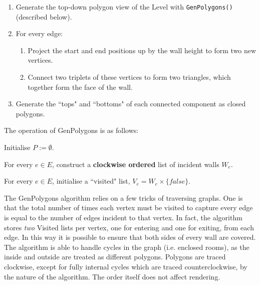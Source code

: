 \begin{enumerate}
\item Generate the top-down polygon view of the Level with \verb|GenPolygons()| (described below).
\item For every edge:
\begin{enumerate}
\item Project the start and end positions up by the wall height to form two new vertices.
\item Connect two triplets of these vertices to form two triangles, which together form the face of the wall.
\end{enumerate}
\item Generate the ``tops" and ``bottoms" of each connected component as closed polygons.
\end{enumerate}

The operation of GenPolygons is as follows:
\begin{algorithm}[h]
\LinesNumbered 


Initialise $P := \emptyset$.

For every $e \in E$, construct a \textbf{clockwise ordered} list of incident walls $W_e$.

For every $e \in E$, initialise a ``visited" list, $V_e = W_e \times \{false\}$.

\end{algorithm}

The GenPolygons algorithm relies on a few tricks of traversing graphs. One is that the total number of times each vertex must be visited to capture every edge is equal to the number of edges incident to that vertex. In fact, the algorithm stores \textit{two} Visited lists per vertex, one for entering and one for exiting, from each edge. In this way it is possible to ensure that both sides of every wall are covered. The algorithm is able to handle cycles in the graph (i.e. enclosed rooms), as the inside and outside are treated as different polygons. Polygons are traced clockwise, except for fully internal cycles which are traced counterclockwise, by the nature of the algorithm. The order itself does not affect rendering. 

